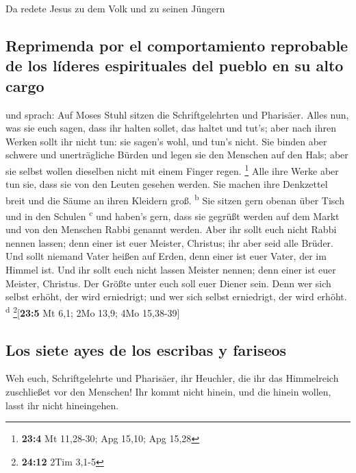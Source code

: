  Da redete Jesus zu dem Volk und zu seinen Jüngern

\hypertarget{reprimenda-por-el-comportamiento-reprobable-de-los-luxedderes-espirituales-del-pueblo-en-su-alto-cargo}{%
\subsection{Reprimenda por el comportamiento reprobable de los líderes
espirituales del pueblo en su alto
cargo}\label{reprimenda-por-el-comportamiento-reprobable-de-los-luxedderes-espirituales-del-pueblo-en-su-alto-cargo}}

 und sprach: Auf Moses Stuhl sitzen die Schriftgelehrten
und Pharisäer.  Alles nun, was sie euch sagen, dass ihr
halten sollet, das haltet und tut's; aber nach ihren Werken sollt ihr
nicht tun: sie sagen's wohl, und tun's nicht.  Sie binden
aber schwere und unerträgliche Bürden und legen sie den Menschen auf den
Hals; aber sie selbst wollen dieselben nicht mit einem Finger regen.
\footnote{\textbf{23:4} Mt 11,28-30; Apg 15,10; Apg 15,28}
 Alle ihre Werke aber tun sie, dass sie von den Leuten
gesehen werden. Sie machen ihre Denkzettel breit und die Säume an ihren
Kleidern groß. \textsuperscript{b}  Sie sitzen gern obenan
über Tisch und in den Schulen \textsuperscript{c}  und
haben's gern, dass sie gegrüßt werden auf dem Markt und von den Menschen
Rabbi genannt werden.  Aber ihr sollt euch nicht Rabbi
nennen lassen; denn einer ist euer Meister, Christus; ihr aber seid alle
Brüder.  Und sollt niemand Vater heißen auf Erden, denn
einer ist euer Vater, der im Himmel ist.  Und ihr sollt
euch nicht lassen Meister nennen; denn einer ist euer Meister, Christus.
 Der Größte unter euch soll euer Diener sein.
 Denn wer sich selbst erhöht, der wird erniedrigt; und
wer sich selbst erniedrigt, der wird erhöht. \textsuperscript{d}
\footnote{\textbf{24:12} 2Tim 3,1-5}{[}\textbf{23:5} Mt 6,1; 2Mo 13,9;
4Mo 15,38-39{]}

\hypertarget{los-siete-ayes-de-los-escribas-y-fariseos}{%
\subsection{Los siete ayes de los escribas y
fariseos}\label{los-siete-ayes-de-los-escribas-y-fariseos}}

 Weh euch, Schriftgelehrte und Pharisäer, ihr Heuchler,
die ihr das Himmelreich zuschließet vor den Menschen! Ihr kommt nicht
hinein, und die hinein wollen, lasst ihr nicht hineingehen.

